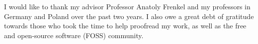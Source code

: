 
I would like to thank my advisor Professor Anatoly Frenkel and my professors in Germany and Poland over the past two years. I also owe a great debt of gratitude towards those who took the time to help proofread my work, as well as the free and open-source software (FOSS) community.